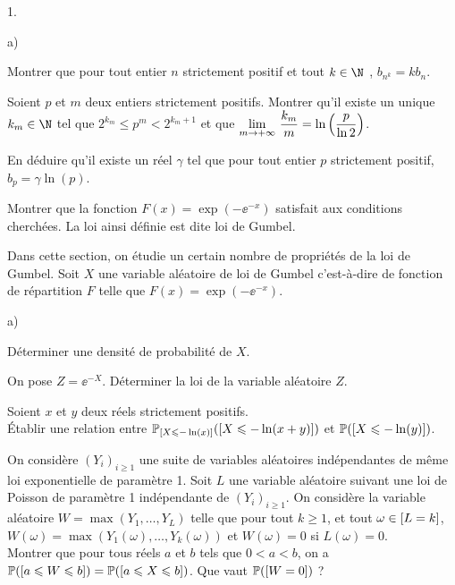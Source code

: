 \documentclass[11pt]{article}%
\begin{document}
\begin{noliste}{1.}
\begin{noliste}{a)}
  \item Montrer que pour tout entier $n$ strictement positif et 
  tout $k\in \N$ , $b_{n^k}=kb_n$.
  
  \item Soient $p$ et $m$ deux entiers strictement positifs. 
  Montrer qu'il existe un unique $k_m\in \N$ tel que 
  $2^{k_m} \leq p^m< 2^{{k_m}+1}$ et que 
  ${\displaystyle \lim_{m\to +\infty } \ } \dfrac{k_m}{m}=\ln \left(\dfrac{p}{\ln 
  2}\right)$.
  
  \item En déduire qu'il existe un réel $\gamma$ tel que pour 
  tout entier $p$ strictement positif,  $b_p=\gamma \ln (p)$.
  
  \item Montrer que la fonction $F(x)=\exp(-\ee^{-x})$ 
  satisfait aux conditions cherchées. La loi ainsi définie est dite 
  loi de Gumbel.
 \end{noliste}
 
 \item Dans cette section, on étudie un certain nombre de 
 propriétés de la loi de Gumbel. Soit $X$ une variable aléatoire de 
 loi de Gumbel c'est-à-dire de fonction de répartition $F$ telle que 
 $F(x)=\exp(-\ee^{-x})$.
 \begin{noliste}{a)}
  \item Déterminer une densité de probabilité de $X$.
  
  \item On pose $Z=\ee^{-X}$. Déterminer la loi de la variable 
  aléatoire $Z$.
  
  \item Soient $x$ et $y$ deux réels strictement positifs.\\
  Établir une relation entre $\mathbb{P}_{\left[ {X\leqslant -\ln (x)} \right]}(\left[ {X\leqslant 
  -\ln(x+y)} \right])$ et $\mathbb{P}(\left[ {X\leqslant -\ln(y)} \right])$.
  
  \item On considère  $(Y_i)_{i\ge 1}$ une suite de variables 
  aléatoires indépendantes de même loi exponentielle de paramètre 
  1. Soit $L$ une variable aléatoire suivant une loi de Poisson de 
  paramètre 1 indépendante de $(Y_i)_{i\geq 1}$. 
  On considère la variable aléatoire $W=\max (Y_1,\dots , Y_L)$ telle 
  que pour tout $k\geq 1$,  et tout $\omega \in \left[ {L=k} \right]$, $W(\omega 
  )=\max (Y_1(\omega ), \dots , Y_k(\omega ))$ et $W(\omega )=0$ si 
  $L(\omega)=0$. \\
  Montrer que pour tous réels $a$ et $b$ tels que $0< a<b$, on a 
  $\mathbb{P}(\left[ {a\leqslant W\leqslant b} \right])=\mathbb{P}(\left[ {a\leqslant X\leqslant b} \right])$. Que vaut 
  $\mathbb{P}(\left[ {W=0} \right])$ ?
 \end{noliste}
\end{noliste}
\end{document}
